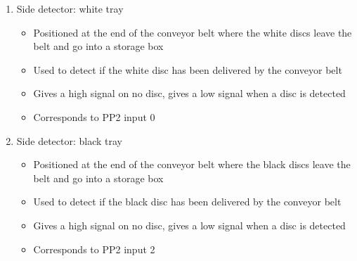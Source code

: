 \documentclass[a4paper,oneside,11pt]{report}
\begin{document}
\begin{enumerate}
\item Side detector: white tray
\begin{itemize}
\item Positioned at the end of the conveyor belt where the white discs leave the belt and go into a storage box
\item Used to detect if the white disc has been delivered by the conveyor belt
\item Gives a high signal on no disc, gives a low signal when a disc is detected
\item Corresponds to PP2 input 0
\end{itemize}
\item Side detector: black tray
\begin{itemize}
\item Positioned at the end of the conveyor belt where the black discs leave the belt and go into a storage box
\item Used to detect if the black disc has been delivered by the conveyor belt
\item Gives a high signal on no disc, gives a low signal when a disc is detected
\item Corresponds to PP2 input 2
\end{itemize}
\end{enumerate}
\end{document}

